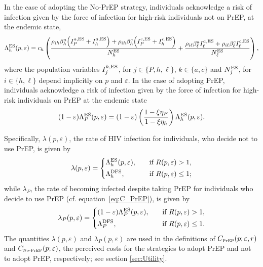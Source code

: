\documentclass[11pt]{article}
\begin{document}
In the case of adopting the No-PrEP strategy, individuals acknowledge a risk of infection given by the force of infection for high-risk individuals not on PrEP, at the endemic state,
\begin{equation}
	\Lambda_h^{\rm ES}(p,\varepsilon) = c_h \left( \frac{\rho_{ih} \beta_h^a \Big(I_P^{a,\rm ES} + I_h^{a,\rm ES}\Big) + \rho_{ih} \beta_h^c \Big(I_P^{c,\rm ES} +I_h^{c,\rm ES} \Big)}{N_h^{\rm ES}} + \frac{\rho_{i\ell} \beta_\ell^a I_\ell^{a,\rm ES} + \rho_{i\ell} \beta_\ell^c I_\ell^{c,\rm ES}}{N_\ell^{\rm ES}}\right),
\end{equation}
where the population variables $I_j^{k,\rm ES}$, for $j\in\{P,h,\ell\}$, $k\in\{a,c\}$ and $N_j^{\rm ES}$, for $i\in\{h,\ell\}$ depend implicitly on $p$ and $\varepsilon$. In the case of adopting PrEP, individuals acknowledge a risk of infection given by the force of infection for high-risk individuals on PrEP at the endemic state
\begin{equation} \label{eq:Lambda_P_ES}
	(1-\varepsilon) \Lambda_P^{\rm ES}(p,\varepsilon) = (1-\varepsilon) \left(\frac{1-\xi \eta_P}{1-\xi \eta_h}\right)\Lambda_h^{\rm ES}(p,\varepsilon).
\end{equation} 

Specifically, $\lambda(p,\varepsilon)$, the rate of HIV infection for individuals, who decide not to use PrEP, is given by
\begin{equation}
	\lambda (p,\varepsilon) = \left\{
	\begin{aligned}
		&\Lambda_h^{\rm ES}(p,\varepsilon),& \quad \text{if } R(p,\varepsilon)>1,\\
		&\Lambda_h^{\rm DFS}, & \quad \text{if } R(p,\varepsilon)\leq 1;
	\end{aligned}
	\right.
\end{equation}
while $\lambda_P$, the rate of becoming infected despite taking PrEP for individuals who decide to use PrEP (cf. equation~\eqref{eq:C_PrEP}), is given by
\begin{equation} \label{eq:lambda_P}
	\lambda_P (p,\varepsilon) = \left\{
	\begin{aligned}
		&(1-\varepsilon)\Lambda_P^{\rm ES}(p,\varepsilon),& \quad \text{if } R(p,\varepsilon)>1,\\
		&\Lambda_P^{\rm DFS}, & \quad \text{if } R(p,\varepsilon)\leq 1.
	\end{aligned}
	\right.
\end{equation}
The quantities $\lambda(p,\varepsilon)$ and $\lambda_P(p,\varepsilon)$ are used in the definitions of $C_{\text{\tiny PrEP}}(p;\varepsilon, r)$ and $C_{\text{\tiny No-PrEP}}(p;\varepsilon)$, the perceived costs for the strategies to adopt PrEP and not to adopt PrEP, respectively; see section \ref{sec:Utility}.
\end{document}
